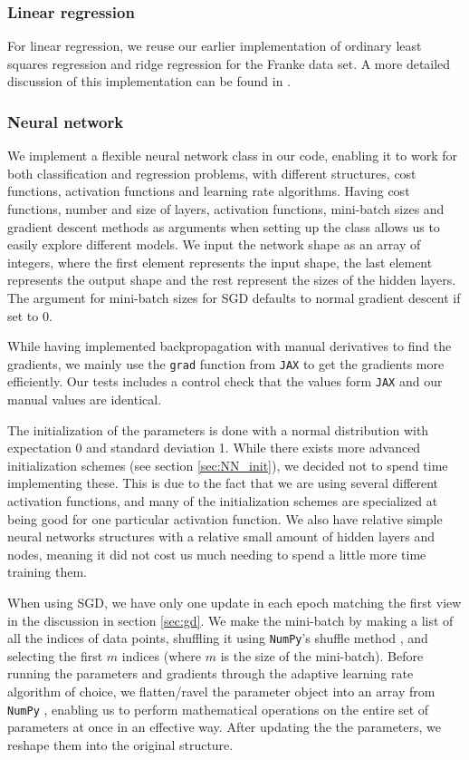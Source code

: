 \subsubsection{Linear regression}

For linear regression, we reuse our earlier implementation of ordinary least squares regression and ridge regression for the Franke data set. A more detailed discussion of this implementation can be found in \textcite{project1}.

\subsubsection{Neural network}\label{sec:nn_imp}

We implement a flexible neural network class in our code, enabling it to work for both classification and regression problems, with different structures, cost functions, activation functions and learning rate algorithms.
Having cost functions, number and size of layers, activation functions, mini-batch sizes and gradient descent methods as arguments when setting up the class allows us to easily explore different models.
We input the network shape as an array of integers, where the first element represents the input shape, the last element represents the output shape and the rest represent the sizes of the hidden layers.
The argument for mini-batch sizes for SGD defaults to normal gradient descent if set to 0.

While having implemented backpropagation with manual derivatives to find the gradients, we mainly use the \texttt{grad} function from \texttt{JAX} \cite{jax2018github} to get the gradients more efficiently.
Our tests includes a control check that the values form \texttt{JAX} and our manual values are identical.

The initialization of the parameters is done with a normal distribution with expectation 0 and standard deviation 1.
While there exists more advanced initialization schemes (see section \ref{sec:NN_init}), we decided not to spend time implementing these.
This is due to the fact that we are using several different activation functions, and many of the initialization schemes are specialized at being good for one particular activation function.
We also have relative simple neural networks structures with a relative small amount of hidden layers and nodes, meaning it did not cost us much needing to spend a little more time training them.

When using SGD, we have only one update in each epoch matching the first view in the discussion in section \ref{sec:gd}.
We make the mini-batch by making a list of all the indices of data points, shuffling it using \texttt{NumPy}'s shuffle method \cite{NumPy-Array}, and selecting the first $m$ indices (where $m$ is the size of the mini-batch).
Before running the parameters and gradients through the adaptive learning rate algorithm of choice, we flatten/ravel the parameter object into an array from \texttt{NumPy} \cite{NumPy-Array}, enabling us to perform mathematical operations on the entire set of parameters at once in an effective way.
After updating the the parameters, we reshape them into the original structure.

